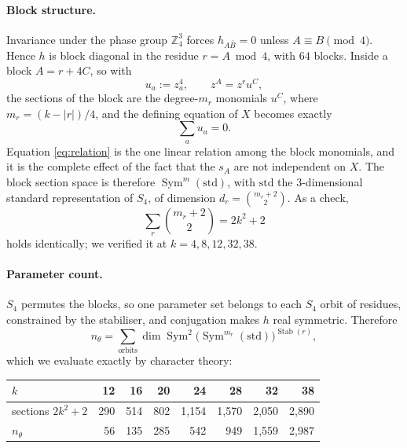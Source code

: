 \documentclass[11pt,a4paper]{article}
\newcommand{\Z}{\mathbb{Z}}
\newcommand{\Sym}{\operatorname{Sym}}
\newcommand{\Stab}{\operatorname{Stab}}
\begin{document}
\paragraph{Block structure.}
Invariance under the phase group $\Z_4^3$ forces $h_{A\bar B}=0$ unless
$A\equiv B \pmod 4$. Hence $h$ is block diagonal in the residue $r=A\bmod4$, with
$64$ blocks. Inside a block $A=r+4C$, so with
\begin{equation}
  u_a:=z_a^4,
  \qquad
  z^A=z^r u^C ,
\end{equation}
the sections of the block are the degree-$m_r$ monomials $u^C$, where
$m_r=(k-|r|)/4$, and the defining equation of $X$ becomes exactly
\begin{equation}
  \textstyle\sum_a u_a=0 .
  \label{eq:relation}
\end{equation}
Equation \eqref{eq:relation} is the one linear relation among the block
monomials, and it is the complete effect of the fact that the $s_A$ are not
independent on $X$. The block section space is therefore
$\Sym^{m}(\mathrm{std})$, with $\mathrm{std}$ the $3$-dimensional standard
representation of $S_4$, of dimension $d_r=\binom{m_r+2}{2}$. As a check,
\begin{equation}
  \sum_r \binom{m_r+2}{2}=2k^2+2
  \label{eq:seccount}
\end{equation}
holds identically; we verified it at $k=4,8,12,32,38$.

\paragraph{Parameter count.}
$S_4$ permutes the blocks, so one parameter set belongs to each $S_4$ orbit of
residues, constrained by the stabiliser, and conjugation makes $h$ real
symmetric. Therefore
\begin{equation}
  n_\theta=\sum_{\text{orbits}}\dim\Sym^2\!\bigl(\Sym^{m_r}(\mathrm{std})\bigr)^{\Stab(r)} ,
  \label{eq:ntheta}
\end{equation}
which we evaluate exactly by character theory:

\begin{center}
\begin{tabular}{lrrrrrrr}
\toprule
$k$ & 12 & 16 & 20 & 24 & 28 & 32 & 38\\
\midrule
sections $2k^2+2$ & 290 & 514 & 802 & 1{,}154 & 1{,}570 & 2{,}050 & 2{,}890\\
$n_\theta$        &  56 & 135 & 285 &   542 &   949 & 1{,}559 & 2{,}987\\
\bottomrule
\end{tabular}
\end{center}
\end{document}
